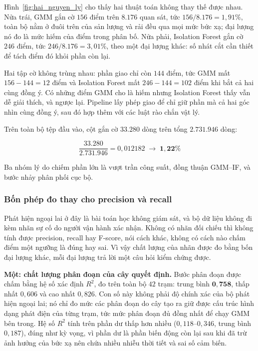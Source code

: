 Hình~\ref{fig:hai_nguyen_ly} cho thấy hai thuật toán không thay thế được nhau. Nửa trái, GMM
gắn cờ $156$ điểm trên $8.176$ quan sát, tức $156 / 8.176 = 1{,}91\%$, toàn bộ nằm ở đuôi trên
của sản lượng và rải đều qua mọi mức bức xạ; đại lượng nó đo là mức hiếm của điểm trong phân
bố. Nửa phải, Isolation Forest gắn cờ $246$ điểm, tức $246 / 8.176 = 3{,}01\%$, theo một đại
lượng khác: số nhát cắt cần thiết để tách điểm đó khỏi phần còn lại.

Hai tập cờ không trùng nhau: phần giao chỉ còn $144$ điểm, tức GMM mất
$156 - 144 = 12$ điểm và Isolation Forest mất $246 - 144 = 102$ điểm khi bắt cả hai cùng đồng
ý. Có những điểm GMM cho là hiếm nhưng Isolation Forest thấy vẫn dễ giải thích, và ngược lại.
Pipeline lấy phép giao để chỉ giữ phần mà cả hai góc nhìn cùng đồng ý, sau đó hợp thêm với các
luật rào chắn vật lý.

Trên toàn bộ tệp đầu vào, cột  gắn cờ $\mathbf{33.280}$ dòng trên
tổng $\mathbf{2.731.946}$ dòng:

\begin{equation}
\frac{33.280}{2.731.946} = 0{,}012182 \;\longrightarrow\; \mathbf{1{,}22\%}
\end{equation}

Ba nhóm lý do chiếm phần lớn là vượt trần công suất, đồng thuận GMM--IF, và bước nhảy phân
phối cục bộ.

\subsubsection{Bốn phép đo thay cho precision và recall}

Phát hiện ngoại lai ở đây là bài toán học không giám sát, và bộ dữ liệu không đi
kèm nhãn sự cố do người vận hành xác nhận. Không có nhãn đối chiếu thì không tính được
precision, recall hay F-score, nói cách khác, không có cách nào chấm điểm một ngưỡng là
đúng hay sai. Vì vậy chất lượng của nhãn được đo bằng bốn đại lượng khác, mỗi đại lượng trả
lời một câu hỏi kiểm chứng được.

\textbf{Một: chất lượng phân đoạn của cây quyết định.} Bước phân đoạn được chấm bằng hệ
số xác định $R^2$, đo trên toàn bộ $42$ trạm: trung bình $\mathbf{0{,}758}$, thấp nhất
$0{,}606$ và cao nhất $0{,}826$. Con số này không phải độ chính xác của bộ phát
hiện ngoại lai; nó chỉ đo mức các phân đoạn do cây tạo ra giữ được cấu trúc hình dạng phát
điện của từng trạm, tức mức phân đoạn đủ đồng nhất để chạy GMM bên trong. Hệ số $R^2$ tính
trên phần dư thấp hơn nhiều ($0{,}118$--$0{,}346$, trung bình $0{,}187$), đúng như kỳ vọng,
vì phần dư là phần biến động còn lại sau khi đã trừ ảnh hưởng của bức xạ nên chứa nhiều
nhiễu thời tiết và sai số cảm biến.

